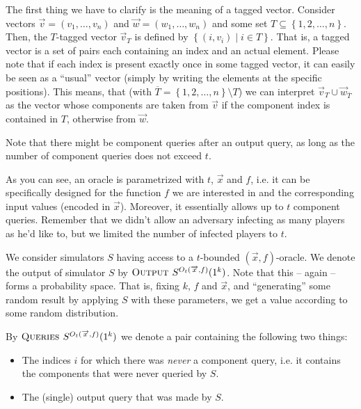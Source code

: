The first thing we have to clarify is the meaning of a tagged vector. Consider vectors $\overrightarrow{v}=(v_1,\dots,v_n)$ and $\overrightarrow{w}=(w_1,\dots,w_n)$ and some set $T\subseteq \left\{ 1,2,\dots,n \right\}$. Then, the $T$-tagged vector $\overrightarrow{v}_T$ is defined by $\left\{ (i,v_i) \mid i\in T \right\}$. That is, a tagged vector is a set of pairs each containing an index and an actual element. Please note that if each index is present exactly once in some tagged vector, it can easily be seen as a ``usual'' vector (simply by writing the elements at the specific positions). This means, that (with $\overline{T}=\left\{ 1,2,\dots,n \right\}\setminus T$) we can interpret $\overrightarrow{v}_T\cup \overrightarrow w_{\overline{T}}$ as the vector whose components are taken from $\overrightarrow{v}$ if the component index is contained in $T$, otherwise from $\overrightarrow{w}$.

Note that there might be component queries after an output query, as long as the number of component queries does not exceed $t$.

As you can see, an oracle is parametrized with $t$, $\overrightarrow{x}$ and $f$, i.e. it can be  specifically designed for the function $f$ we are interested in and the corresponding input values (encoded in $\overrightarrow{x}$). Moreover, it essentially allows up to $t$ component queries. Remember that we didn't allow an adversary infecting as many players as he'd like to, but we limited the number of infected players to $t$.

We consider simulators $S$ having access to a $t$-bounded $(\overrightarrow{x},f)$-oracle. We denote the output of simulator $S$ by $\textsc{Output } S^{O_t(\overrightarrow{x},f)}(1^k)$. Note that this -- again -- forms a probability space. That is, fixing $k$, $f$ and $\overrightarrow{x}$, and ``generating'' some random result by applying $S$ with these parameters, we get a value according to some random distribution.

By $\textsc{Queries } S^{O_t(\overrightarrow{x},f)}(1^k)$ we denote a pair containing the following two things:

\begin{itemize}
\item The indices $i$ for which there was \emph{never} a component query, i.e. it contains the components that were never queried by $S$.
\item The (single) output query that was made by $S$.
\end{itemize}

